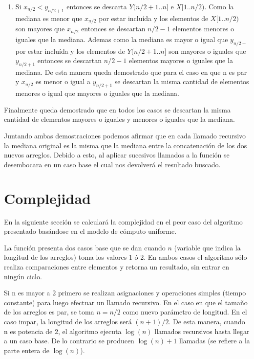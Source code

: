 \documentclass[a4paper,10pt] {article}
\begin{document}
\begin{enumerate}
\begin{enumerate}
\item
Si $x_{n/2} < y_{n/2+1}$ entonces se descarta $Y(n/2+1..n]$ e $X[1..n/2)$. Como la mediana es menor que $x_{n/2}$ por estar inclu\'ida y los elementos de $X[1..n/2)$ son mayores que $x_{n/2}$ entonces se descartan $n/2-1$ elementos menores o iguales que la mediana. Ademas como la mediana es mayor o igual que $y_{n/2+}$ por estar inclu\'ida y los elementos de $Y(n/2+1..n]$ son mayores o iguales que $y_{n/2+1}$ entonces se descartan $n/2-1$ elementos mayores o iguales que la mediana. De esta manera queda demostrado que para el caso en que n es par y $x_{n/2}$ es menor o igual a $y_{n/2+1}$ se descartan la misma cantidad de elementos menores o igual que mayores o iguales que la mediana.
\end{enumerate}

\end{enumerate}

Finalmente queda demostrado que en todos los casos se descartan la misma cantidad de elementos mayores o iguales y menores o iguales que la mediana.

Juntando ambas demostraciones podemos afirmar que en cada llamado recursivo la mediana original es la misma que la mediana entre la concatenaci\'on de los dos nuevos arreglos. Debido a esto, al aplicar sucesivos llamados a la funci\'on se desembocara en un caso base el cual nos devolver\'a el resultado buscado.

\section*{Complejidad}
 
En la siguiente secci\'on se calcular\'a la complejidad en el peor caso del algoritmo presentado bas\'andose en el modelo de c\'omputo uniforme.

La funci\'on presenta dos casos base que se dan cuando $n$ (variable que indica la longitud de los arreglos) toma los valores 1 \'o 2. En ambos casos el algoritmo s\'olo realiza comparaciones entre elementos y retorna un resultado, sin entrar en ning\'un ciclo.

Si n es mayor a 2 primero se realizan asignaciones y operaciones simples (tiempo constante) para luego efectuar un llamado recursivo. En el caso en que el tama\~{n}o de los arreglos es par, se toma $n=n/2$ como nuevo par\'ametro de longitud. En el caso impar, la longitud de los arreglos ser\'a $(n+1)/2$. De esta manera, cuando n es potencia de 2, el algoritmo ejecuta $\log(n)$ llamados recursivos hasta llegar a un caso base. De lo contrario se producen $\log(n)+1$ llamadas (se refiere a la parte entera de $\log(n)$).
\end{document}
